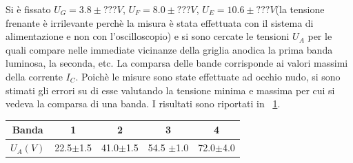 \documentclass[10pt,a4paper]{article}
\begin{document}
Si è fissato $U_{G} = 3.8 \pm ??? V$, $U_{F}=8.0 \pm ??? V$, $U_{E} = 10.6 \pm ??? V$(la tensione frenante è irrilevante perchè la misura è stata effettuata con il sistema di alimentazione e non con l'oscilloscopio) e si sono cercate le tensioni $U_{A}$ per le quali compare nelle immediate vicinanze della griglia anodica la prima banda luminosa, la seconda, etc. La comparsa delle bande corrisponde ai valori massimi della corrente $I_{C}$. Poichè le misure sono state effettuate ad occhio nudo, si sono stimati gli errori su di esse valutando la tensione minima e massima per cui si vedeva la comparsa di una banda. I risultati sono riportati in \tablename{~\ref{tab:massimi}}.

\begin{table}[h!]
\centering
\begin{tabular}{c|c|c|c|c}
\hline
Banda &1&2&3&4\\
\hline 
$U_{A} (V)$ & 22.5$\pm$1.5 & 41.0$\pm$1.5 & 54.5 $\pm$1.0 & 72.0$\pm$4.0  \\ 
\hline
\end{tabular}
\label{tab:massimi}
\end{table}



\end{document}
